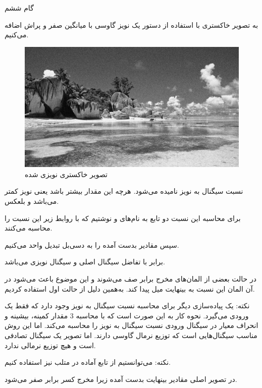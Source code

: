 \Problem
{گام ششم}
{
    به تصویر خاکستری با استفاده از دستور 
    یک نویز گاوسی با میانگین صفر و پراش 
    اضافه می‌کنیم.
    
    \begin{figure}[H]
        \includegraphics[width=15cm]{Images/Noisy.jpg}
        \centering
        \caption{تصویر خاکستری نویزی شده}
    \end{figure}
    
    نسبت سیگنال به نویز 
    نامیده می‌شود. هرچه این مقدار بیشتر باشد یعنی نویز کمتر می‌باشد و بلعکس.
    
    برای محاسبه این نسبت دو تابع به نام‌های 
     و  
    نوشتیم که با روابط زیر این نسبت را محاسبه می‌کنند.
    
    \begin{center}
    \end{center}
    
    \RTL
    سپس مقادیر بدست آمده را به دسی‌بل تبدیل واحد می‌کنیم.
    
    برابر با تفاضل سیگنال اصلی 
    و سیگنال نویزی 
    می‌باشد.
    
    در حالت 
    بعضی از المان‌های مخرج برابر صف می‌شوند و این موضوع باعث می‌شود در آن المان این نسبت به بینهایت میل پیدا کند. به‌همین دلیل از حالت اول استفاده کردیم.
    
    \newpage
    نکته: یک پیاده‌سازی دیگر برای محاسبه نسبت سیگنال به نویز وجود دارد که فقط یک ورودی می‌گیرد. نحوه کار به این صورت است که با محاسبه 3 مقدار کمینه، بیشینه و انحراف معیار در سیگنال ورودی نسبت سیگنال به نویز را محاسبه می‌کند. اما این روش مناسب سیگنال‌هایی است که توزیع نرمال گاوسی دارند. اما تصویر یک سیگنال تصادفی است و هیچ توزیع نرمالی ندارد.
    
    نکته: می‌توانستیم از تابع آماده 
    در متلب نیز استفاده کنیم.
    
    
    \LTR
    
    
    
    
    \RTL
    در تصویر اصلی مقادیر بینهایت بدست آمده زیرا مخرج کسر برابر صفر می‌شود.
    
}